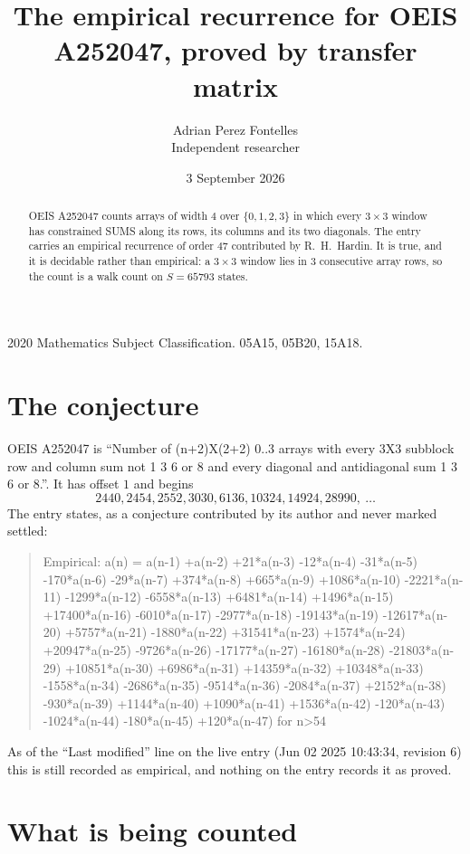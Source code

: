 \documentclass[11pt,a4paper]{article}
\title{The empirical recurrence for OEIS A252047, proved by transfer matrix}
\author{Adrian Perez Fontelles\\ \small Independent researcher}
\date{3 September 2026}
\theoremstyle{plain}
\theoremstyle{definition}
\begin{document}
\maketitle

\begin{abstract}
OEIS A252047 counts arrays of width $4$ over $\{0,1,2,3\}$ in which every $3\times3$ window has
constrained SUMS along its rows, its columns and its two diagonals. The entry carries an
empirical recurrence of order $47$ contributed by R.~H.~Hardin. It is true, and it is
decidable rather than empirical: a $3\times3$ window lies in $3$ consecutive array rows,
so the count is a walk count on $S=65793$ states.
\end{abstract}

\noindent\small 2020 Mathematics Subject Classification. 05A15, 05B20, 15A18.\normalsize

\section{The conjecture}

OEIS A252047 is ``Number of (n+2)X(2+2) 0..3 arrays with every 3X3 subblock row and column sum not 1 3 6 or 8 and every diagonal and antidiagonal sum 1 3 6 or 8.''. It has offset $1$ and begins
\[
2440, 2454, 2552, 3030, 6136, 10324, 14924, 28990,\ \dots
\]
The entry states, as a conjecture contributed by its author and never marked settled:
\begin{quote}
Empirical: a(n) = a(n-1) +a(n-2) +21*a(n-3) -12*a(n-4) -31*a(n-5) -170*a(n-6) -29*a(n-7) +374*a(n-8) +665*a(n-9) +1086*a(n-10) -2221*a(n-11) -1299*a(n-12) -6558*a(n-13) +6481*a(n-14) +1496*a(n-15) +17400*a(n-16) -6010*a(n-17) -2977*a(n-18) -19143*a(n-19) -12617*a(n-20) +5757*a(n-21) -1880*a(n-22) +31541*a(n-23) +1574*a(n-24) +20947*a(n-25) -9726*a(n-26) -17177*a(n-27) -16180*a(n-28) -21803*a(n-29) +10851*a(n-30) +6986*a(n-31) +14359*a(n-32) +10348*a(n-33) -1558*a(n-34) -2686*a(n-35) -9514*a(n-36) -2084*a(n-37) +2152*a(n-38) -930*a(n-39) +1144*a(n-40) +1090*a(n-41) +1536*a(n-42) -120*a(n-43) -1024*a(n-44) -180*a(n-45) +120*a(n-47) for n>54
\end{quote}
As of the ``Last modified'' line on the live entry (Jun 02 2025 10:43:34, revision 6) this is still
recorded as empirical, and nothing on the entry records it as proved.

\section{What is being counted}
\end{document}
